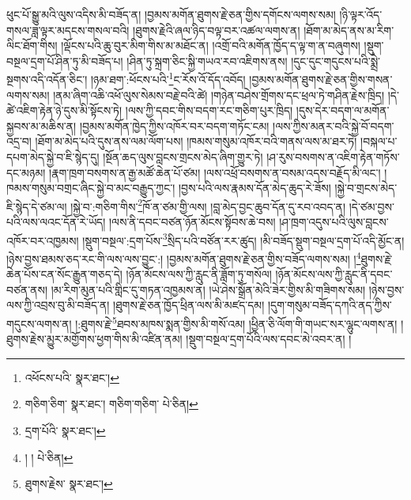 ཕུང་པོ་སྒྱུ་མའི་ལུས་འདིས་མི་བཟོད་ན། །བྱམས་མགོན་ཐུགས་རྗེ་ཅན་གྱིས་དགོངས་ལགས་སམ། །ཉི་ལྟར་འོད་གསལ་ཟླ་ལྟར་མདངས་གསལ་བའི། །ཐུགས་རྗེའི་ཞལ་ཉིད་བལྟ་བར་འཚལ་ལགས་ན། །ཐོག་མ་མེད་ནས་མ་རིག་ལིང་ཐོག་གིས། །ལྡོངས་པའི་ཆུ་བུར་མིག་གིས་མ་མཐོང་ན། །འགྲོ་བའི་མགོན་ཁྱོད་ད་ལྟ་ག་ན་བཞུགས། །སྡུག་བསྔལ་དྲག་པོ་ཤིན་ཏུ་མི་བཟོད་པ། །ཤིན་ཏུ་སྐྲག་ཅིང་སྐྱི་གཡའ་རབ་འཇིགས་ནས། །དུང་དུང་གདུངས་པའི་སྨྲེ་སྔགས་འདི་འདོན་ཅིང་། །ཉམ་ཐག་:ཕོངས་པའི་\footnote{འཕོངས་པའི་  སྣར་ཐང་། }ང་རོས་འོ་དོད་འབོད། །བྱམས་མགོན་ཐུགས་རྗེ་ཅན་གྱིས་གསན་ལགས་སམ། །ནམ་ཞིག་འཆི་འཕོ་ལུས་སེམས་བརྗེ་བའི་ཚེ། །གཉེན་བཤེས་གྲོགས་དང་ཕྲལ་ཏེ་གཤིན་རྗེས་ཁྲིད། །དེ་ཚེ་འཇིག་རྟེན་ཉེ་དུས་མི་སྟོངས་ཏེ། །ལས་ཀྱི་དབང་གིས་བདག་རང་གཅིག་པུར་ཁྲིད། །དུས་དེར་བདག་ལ་མགོན་སྐྱབས་མ་མཆིས་ན། །བྱམས་མགོན་ཁྱེད་ཀྱིས་འཁོར་བར་བདག་གཏོང་ངམ། །ལས་ཀྱིས་མནར་བའི་སྐྱེ་བོ་བདག་འདྲ་བ། །ཐོག་མ་མེད་པའི་དུས་ནས་ལམ་ལོག་པས། །ཁམས་གསུམ་འཁོར་བའི་གནས་ལས་མ་ཐར་ཏེ། །བསྐལ་པ་དཔག་མེད་སྐྱེ་བ་ཇི་སྙེད་དུ། །སྔོན་ཆད་ལུས་བླངས་གྲངས་མེད་ཞིག་གྱུར་ཏེ། །ཤ་རུས་བསགས་ན་འཇིག་རྟེན་གཏོས་དང་མཉམ། །རྣག་ཁྲག་བསགས་ན་རྒྱ་མཚོ་ཆེན་པོ་ཙམ། །ལས་འཕྲོ་བསགས་ན་བསམ་འདས་བརྗོད་མི་ལང་། །ཁམས་གསུམ་བགྲང་ཞིང་སྐྱེ་བ་མང་བརྒྱུད་ཀྱང་། །བྱས་པའི་ལས་རྣམས་དོན་མེད་ཆུད་རེ་ཟོས། །སྐྱེ་བ་གྲངས་མེད་ཇི་སྙེད་དེ་ཙམ་ལ། །སྐྱེ་བ་:གཅིག་གིས་\footnote{གཅིག་ཅིག་  སྣར་ཐང་། གཅིག་གཅིག་  པེ་ཅིན། }ཁོ་ན་ཙམ་གྱི་ལས། །བླ་མེད་བྱང་ཆུབ་དོན་དུ་རབ་འབད་ན། །དེ་ཙམ་བྱས་པའི་ལས་ལའང་དོན་རེ་ཡོད། །ལས་ནི་དབང་བཙན་ཉོན་མོངས་སྟོབས་ཆེ་བས། །ཤ་ཁྲག་འདུས་པའི་ལུས་བླངས་འཁོར་བར་འཁྱམས། །སྡུག་བསྔལ་:དྲག་པོས་\footnote{དྲག་པོའི་  སྣར་ཐང་། }སྲིད་པའི་བཙོན་རར་ཚུད། །མི་བཟོད་སྡུག་བསྔལ་དྲག་པོ་འདི་མྱོང་ན། །ཉེས་བྱས་ཐམས་ཅད་རང་གི་ལས་ལས་བྱུང་:། །བྱམས་མགོན་ཐུགས་རྗེ་ཅན་གྱིས་བཟོད་ལགས་སམ། །\footnote{། །  པེ་ཅིན། }ཐུགས་རྗེ་ཆེན་པོས་ངན་སོང་རྒྱུན་གཅད་དེ། །ཉོན་མོངས་ལས་ཀྱི་རླུང་ནི་ཟློག་ཏུ་གསོལ། །ཉོན་མོངས་ལས་ཀྱི་རླུང་ནི་དབང་བཙན་ནས། །མ་རིག་མུན་པའི་གླིང་དུ་གཏན་འཁྱམས་ན། །ཡེ་ཤེས་སྒྲོན་མེའི་ཟེར་གྱིས་མི་གཟིགས་སམ། །ཉེས་བྱས་ལས་ཀྱི་འབྲས་བུ་མི་བཟོད་ན། །ཐུགས་རྗེ་ཅན་ཁྱོད་ཕྲིན་ལས་མི་མཛད་དམ། །དུག་གསུམ་བཟོད་དཀའི་ནད་ཀྱིས་གདུངས་ལགས་ན། །:ཐུགས་རྗེ་\footnote{ཐུགས་རྗེས་  སྣར་ཐང་། }ཐབས་མཁས་སྨན་གྱིས་མི་གསོ་འམ། །ཕྱིན་ཅི་ལོག་གི་གཡང་སར་ལྷུང་ལགས་ན། །ཐུགས་རྗེས་མྱུར་མགྱོགས་ཕྱག་གིས་མི་འཛིན་ནམ། །སྡུག་བསྔལ་དྲག་པོའི་ལས་དབང་མེ་འབར་ན། །
